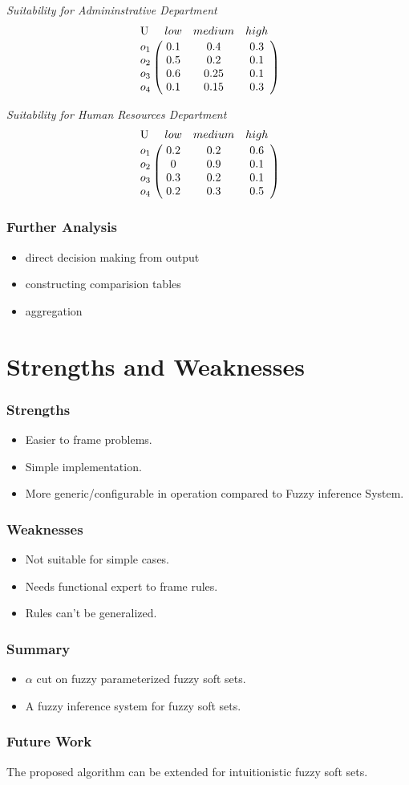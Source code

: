 \documentclass{beamer}
\begin{document}
  \begin{frame}
  \emph{Suitability for Admininstrative Department} \\
  $$\bordermatrix{
  \text{U} & low & medium & high  \cr
  o_1 & 0.1 & 0.4 & 0.3  \cr
  o_2 &0.5 & 0.2 & 0.1  \cr
  o_3 &0.6& 0.25 & 0.1  \cr
  o_4 &0.1 & 0.15 & 0.3
  }$$

  \emph{Suitability for Human Resources Department} \\
  $$\bordermatrix{
  \text{U} & low & medium & high  \cr
  o_1  &0.2 & 0.2 & 0.6  \cr
  o_2 &0 & 0.9 & 0.1  \cr
  o_3 &0.3 & 0.2 & 0.1  \cr
  o_4 &0.2 & 0.3 & 0.5
  }$$
  \end{frame}


\begin{frame}
\frametitle{Further Analysis}
\begin{itemize}
\item direct decision making from output
\item constructing comparision tables
\item aggregation
\end{itemize}
\end{frame}

\section{Strengths and Weaknesses}
\begin{frame}
\frametitle{Strengths}
\begin{itemize}
\item Easier to frame problems.
\item Simple implementation.
\item More generic/configurable in operation compared to Fuzzy inference System.
\end{itemize}
\end{frame}

\begin{frame}
\frametitle{Weaknesses}
\begin{itemize}
\item Not suitable for simple cases.
\item Needs functional expert to frame rules.
\item Rules can't be generalized.
\end{itemize}
\end{frame}


  \begin{frame}
    \frametitle{Summary}
    \begin{itemize}
    \item $\alpha$ cut on fuzzy
  parameterized fuzzy soft sets. 
  
  \item A fuzzy inference system for fuzzy soft sets.
  \end{itemize}
  \end{frame}


  
  \begin{frame}
  \frametitle{Future Work}
  The proposed algorithm can be extended for intuitionistic fuzzy soft sets.
  \end{frame}
  {}

\end{document}
